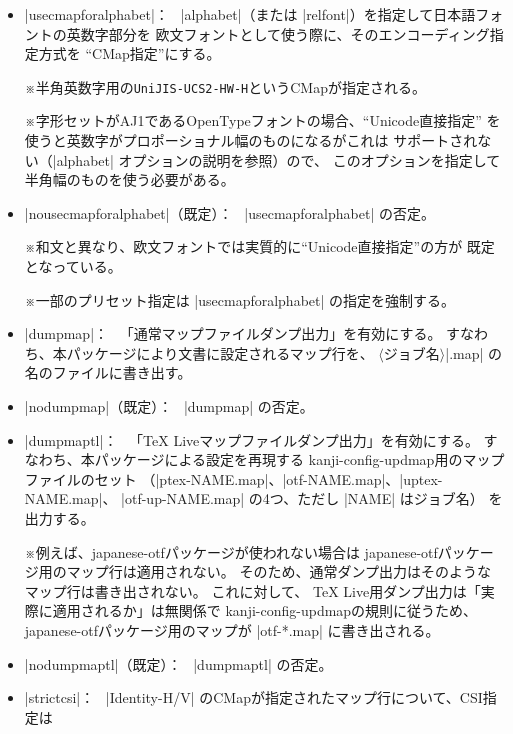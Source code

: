 \documentclass[uplatex,dvipdfmx,a4paper]{jsarticle}
\newcommand{\Pkg}[1]{\textsf{#1}}
\newcommand{\Meta}[1]{$\langle$\mbox{}#1\mbox{}$\rangle$}
\newcommand{\Note}{\par\noindent ※}
\newcommand{\Means}{：\ }
\begin{document}
\begin{itemize}
\item |usecmapforalphabet|\Means
  |alphabet|（または |relfont|）を指定して日本語フォントの英数字部分を
  欧文フォントとして使う際に、そのエンコーディング指定方式を
  “CMap指定”にする。
  \Note 半角英数字用の\texttt{UniJIS-UCS2-HW-H}というCMapが指定される。
  \Note 字形セットがAJ1であるOpenTypeフォントの場合、“Unicode直接指定”
  を使うと英数字がプロポーショナル幅のものになるがこれは
  サポートされない（|alphabet| オプションの説明を参照）ので、
  このオプションを指定して半角幅のものを使う必要がある。
\item |nousecmapforalphabet|（既定）\Means
  |usecmapforalphabet| の否定。
  \Note 和文と異なり、欧文フォントでは実質的に“Unicode直接指定”の方が
  既定となっている。
  \Note 一部のプリセット指定は |usecmapforalphabet| の指定を強制する。
\item |dumpmap|\Means
  「通常マップファイルダンプ出力」を有効にする。
  すなわち、本パッケージにより文書に設定されるマップ行を、
  \Meta{ジョブ名}|.map| の名のファイルに書き出す。
\item |nodumpmap|（既定）\Means
  |dumpmap| の否定。
\item |dumpmaptl|\Means
  「{\TeX} Liveマップファイルダンプ出力」を有効にする。
  すなわち、本パッケージによる設定を再現する
  kanji-config-updmap用のマップファイルのセット
  （|ptex-NAME.map|、|otf-NAME.map|、|uptex-NAME.map|、
  |otf-up-NAME.map| の4つ、ただし |NAME| はジョブ名）
  を出力する。
  \Note 例えば、\Pkg{japanese-otf}パッケージが使われない場合は
  \Pkg{japanese-otf}パッケージ用のマップ行は適用されない。
  そのため、通常ダンプ出力はそのようなマップ行は書き出されない。
  これに対して、
  {\TeX} Live用ダンプ出力は「実際に適用されるか」は無関係で
  kanji-config-updmapの規則に従うため、
  \Pkg{japanese-otf}パッケージ用のマップが |otf-*.map| に書き出される。
\item |nodumpmaptl|（既定）\Means
  |dumpmaptl| の否定。
\item |strictcsi|\Means
  |Identity-H/V| のCMapが指定されたマップ行について、CSI指定は

\end{itemize}
\end{document}
